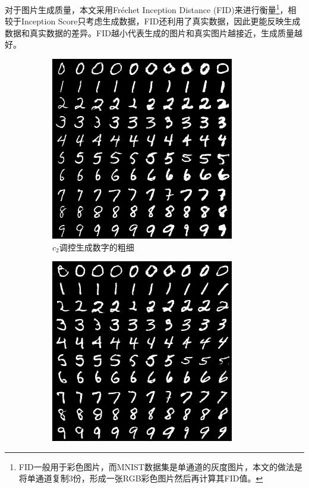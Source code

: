 对于图片生成质量，本文采用Fréchet Inception Distance (FID)\citep{heusel2017gans}来进行衡量\footnote{FID一般用于彩色图片，而MNIST数据集是单通道的灰度图片，本文的做法是将单通道复制3份，形成一张RGB彩色图片然后再计算其FID值。}，相较于Inception Score\citep{salimans2016improved}只考虑生成数据，FID还利用了真实数据，因此更能反映生成数据和真实数据的差异。FID越小代表生成的图片和真实图片越接近，生成质量越好。

\begin{figure}[htb]
  \centering
  \begin{subfigure}[b]{\trif\textwidth}
    \includegraphics[width=\textwidth]{Img/icg-width.png}
    \caption{$c_2$调控生成数字的粗细}
    \label{ffig:m-icg-witdth}
  \end{subfigure} 
  \begin{subfigure}[b]{\trif\textwidth}
    \includegraphics[width=\textwidth]{Img/icg-rotation.png}

\end{subfigure}
\end{figure}
